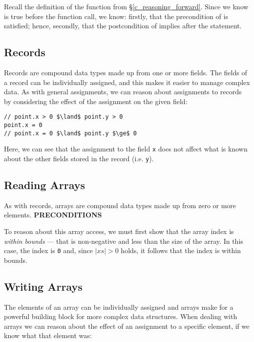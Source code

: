 Recall the definition of the  function from \S\ref{c_reasoning_forward}.  Since we know  is true before the function call, we know: firstly, that the precondition of  is satisfied; hence, secondly, that the postcondition of  implies  after the statement.

\subsection{Records}
Records are compound data types made up from one or more fields.  The fields of a record can be individually assigned, and this makes it easier to manage complex data.  As with general assignments, we can reason about assignments to records by considering the effect of the assignment on the given field:

\begin{tcolorbox}\begin{lstlisting}[language=Whiley]
// point.x > 0 $\land$ point.y > 0
point.x = 0
// point.x = 0 $\land$ point.y $\ge$ 0
\end{lstlisting}\end{tcolorbox}

Here, we can see that the assignment to the field \lstinline{x} does not affect what is known about the other fields stored in the record (i.e. \lstinline{y}).

\subsection{Reading Arrays}
\label{c_reasoning_reading_arrays}
As with records, arrays are compound data types made up from zero or more elements.    {\bf PRECONDITIONS}

To reason about this array access, we must first show that the array index is {\em within bounds} --- that is non-negative and less than the size of the array.  In this case, the index is \lstinline{0} and, since $|xs| > 0$ holds, it follows that the index is within bounds.


\subsection{Writing Arrays}
The elements of an array can be individually assigned and arrays make for a powerful building block for more complex data structures.  When dealing with arrays we can reason about the effect of an assignment to a specific element, if we know what that element was:

